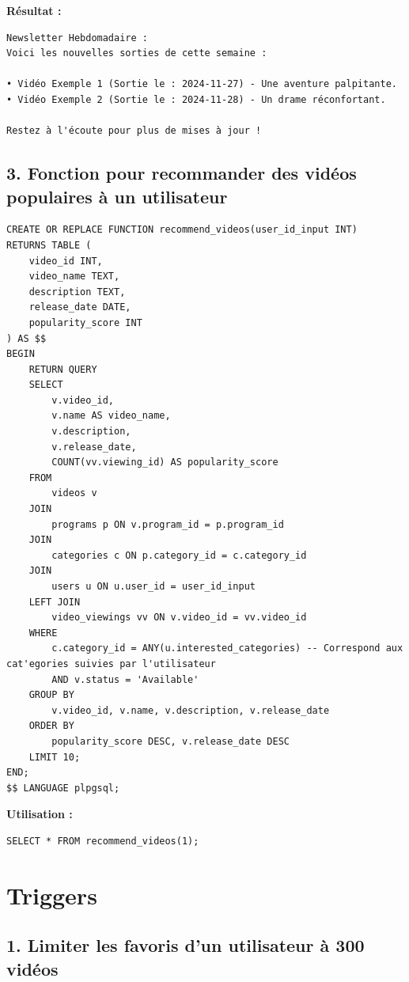 \documentclass[a4paper, 12pt]{article}
\begin{document}
\textbf{Résultat :}

\begin{verbatim}
Newsletter Hebdomadaire : 
Voici les nouvelles sorties de cette semaine :

• Vidéo Exemple 1 (Sortie le : 2024-11-27) - Une aventure palpitante.
• Vidéo Exemple 2 (Sortie le : 2024-11-28) - Un drame réconfortant.

Restez à l'écoute pour plus de mises à jour !
\end{verbatim}

\subsection*{3. Fonction pour recommander des vidéos populaires à un utilisateur}

\begin{lstlisting}
CREATE OR REPLACE FUNCTION recommend_videos(user_id_input INT)
RETURNS TABLE (
    video_id INT,
    video_name TEXT,
    description TEXT,
    release_date DATE,
    popularity_score INT
) AS $$
BEGIN
    RETURN QUERY
    SELECT 
        v.video_id,
        v.name AS video_name,
        v.description,
        v.release_date,
        COUNT(vv.viewing_id) AS popularity_score
    FROM 
        videos v
    JOIN 
        programs p ON v.program_id = p.program_id
    JOIN 
        categories c ON p.category_id = c.category_id
    JOIN 
        users u ON u.user_id = user_id_input
    LEFT JOIN 
        video_viewings vv ON v.video_id = vv.video_id
    WHERE 
        c.category_id = ANY(u.interested_categories) -- Correspond aux cat'egories suivies par l'utilisateur
        AND v.status = 'Available'
    GROUP BY 
        v.video_id, v.name, v.description, v.release_date
    ORDER BY 
        popularity_score DESC, v.release_date DESC
    LIMIT 10;
END;
$$ LANGUAGE plpgsql;
\end{lstlisting}

\textbf{Utilisation :}

\begin{lstlisting}
SELECT * FROM recommend_videos(1);
\end{lstlisting}

\section*{Triggers}

\subsection*{1. Limiter les favoris d'un utilisateur à 300 vidéos}
\end{document}
